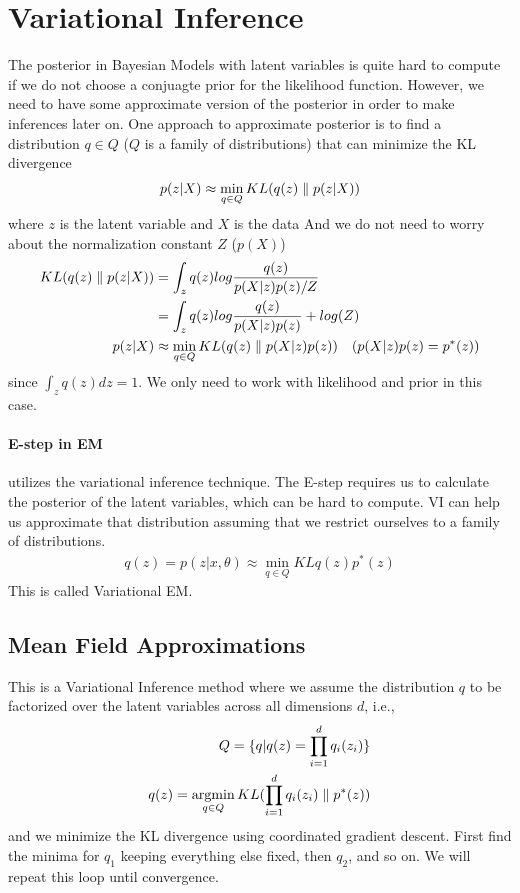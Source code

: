 \documentclass[../statistical_learning_notes.tex]{subfiles}
\begin{document}
\section{Variational Inference}
The posterior in Bayesian Models with latent variables is quite hard to compute if we do not choose a conjuagte prior for the likelihood function. However, we need to have some approximate version of the posterior in order to make inferences later on. One approach to approximate posterior is to find a distribution $q \in Q$ ($Q$ is a family of distributions) that can minimize the KL divergence
\begin{align*}
    p(z|X) \approx \min_{q \in Q} KL(q(z) \parallel p(z|X))
\end{align*}
where $z$ is the latent variable and $X$ is the data
And we do not need to worry about the normalization constant $Z$ ($p(X)$)
\begin{align*}
    KL(q(z) \parallel p(z|X)) &= \int_{z} q(z) log\frac{q(z)}{p(X|z)p(z)/Z}\\
    &= \int_{z} q(z) log\frac{q(z)}{p(X|z)p(z)}  + log(Z)\\
    p(z|X) &\approx \min_{q \in Q} KL(q(z) \parallel p(X|z)p(z)) \quad (p(X|z)p(z) = p^{*}(z))
\end{align*}
since $\int_{z} q(z) dz = 1$. We only need to work with likelihood and prior in this case.

\paragraph{E-step in EM} utilizes the variational inference technique. The E-step requires us to calculate the posterior of the latent variables, which can be hard to compute. VI can help us approximate that distribution assuming that we restrict ourselves to a family of distributions.
\begin{align*}
    q(z) = p(z|x, \theta) \approx \min_{q \in Q}KL{q(z)}{p^{*}(z)}
\end{align*}
This is called Variational EM.


\subsection{Mean Field Approximations}
This is a Variational Inference method where we assume the distribution $q$ to be factorized over the latent variables across all dimensions $d$, i.e.,
\begin{align*}
    Q = \{q | q(z) = \prod_{i=1}^{d}q_{i}(z_{i}) \}\\
    q(z) = \operatorname*{argmin}_{q \in Q} KL(\prod_{i=1}^{d}q_{i}(z_{i}) \parallel p^{*}(z))
\end{align*}
and we minimize the KL divergence using coordinated gradient descent. First find the minima for $q_{1}$ keeping everything else fixed, then $q_{2}$, and so on. We will repeat this loop until convergence.\newline
\end{document}
